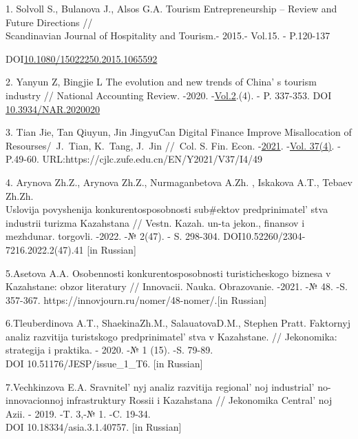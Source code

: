 \begin{references}

1. Solvoll S., Bulanova J., Alsos G.A. Tourism Entrepreneurship --
Review and Future Directions // \\Scandinavian Journal of Hospitality and
Tourism.- 2015.- Vol.15. - P.120-137

DOI\href{http://dx.doi.org/10.1080/15022250.2015.1065592}{10.1080/15022250.2015.1065592}

2. Yanyun Z, Bingjie L The evolution and new trends of
China' s tourism industry // National Accounting Review.
-2020.
-\href{https://www.aimspress.com/nar/article/archives}{Vol.2}.(4). - P.
337-353. DOI
\href{https://doi.org/10.3934/NAR.2020020}{10.3934/NAR.2020020}

3. Tian Jie, Tan Qiuyun, Jin JingyuCan Digital Finance Improve
Misallocation of Resourses/~J.~Tian, K.~Tang, J.~Jin //~Col. S. Fin.
Econ.
-\href{https://cjlc.zufe.edu.cn/EN/article/showTenYearVolumnDetail.do?nian=2021}{2021}.
-\href{https://cjlc.zufe.edu.cn/EN/article/showTenYearVolumnDetail.do?nian=2021}{Vol.
37}\href{file:///C:/Users/admin/Desktop/Вестник\%20КазУТБ/4\%202024/(4)}{(4)}.
- P.49-60.
URL:{https://cjlc.zufe.edu.cn/EN/Y2021/V37/I4/49}

4. Arynova Zh.Z., Arynova Zh.Z., Nurmaganbetova A.Zh. , Iskakova A.T.,
Tebaev Zh.Zh. \\Uslovija povyshenija konkurentosposobnosti sub\#ektov
predprinimatel' stva industrii turizma Kazahstana //
Vestn. Kazah. un-ta jekon., finansov i mezhdunar. torgovli. -2022. -№
2(47). - S. 298-304. DOI10.52260/2304-7216.2022.2(47).41 {[}in
Russian{]}

5.Asetova A.A. Osobennosti konkurentosposobnosti turisticheskogo biznesa
v Kazahstane: obzor literatury // Innovacii. Nauka. Obrazovanie. -2021.
-№ 48. -S. 357-367.
https://innovjourn.ru/nomer/48-nomer/.{[}in Russian{]}

6.Tleuberdinova A.T., ShaekinaZh.M., SalauatovaD.M., Stephen Pratt.
Faktornyj analiz razvitija turistskogo
predprinimatel' stva v Kazahstane. // Jekonomika:
strategija i praktika. - 2020. -№ 1 (15). -S. 79-89. \\DOI
10.51176/JESP/issue\_1\_T6. {[}in Russian{]}

7.Vechkinzova E.A. Sravnitel' nyj analiz razvitija
regional' noj industrial' no-innovacionnoj
infrastruktury Rossii i Kazahstana // Jekonomika
Central' noj Azii. - 2019. -T. 3,-№ 1. -C. 19-34. \\DOI
10.18334/asia.3.1.40757. {[}in Russian{]}


\end{references}
